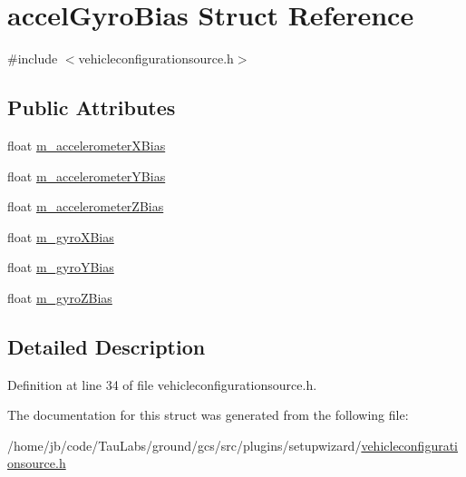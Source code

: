 \hypertarget{structaccel_gyro_bias}{\section{accel\-Gyro\-Bias \-Struct \-Reference}
\label{structaccel_gyro_bias}
}


{\ttfamily \#include $<$vehicleconfigurationsource.\-h$>$}

\subsection*{\-Public \-Attributes}
\begin{DoxyCompactItemize}
\item 
float \hyperlink{group___vehicle_configuration_source_ga982c33b20f567fe289dd461ce9bb0df2}{m\-\_\-accelerometer\-X\-Bias}
\item 
float \hyperlink{group___vehicle_configuration_source_ga76b3af5f8c4f87a92045a698eb32c681}{m\-\_\-accelerometer\-Y\-Bias}
\item 
float \hyperlink{group___vehicle_configuration_source_gaa0475cba1c09df9c39a69bbb62711b8e}{m\-\_\-accelerometer\-Z\-Bias}
\item 
float \hyperlink{group___vehicle_configuration_source_ga483a0631083ce446a08b73ecc712ed73}{m\-\_\-gyro\-X\-Bias}
\item 
float \hyperlink{group___vehicle_configuration_source_gade8f76b5b608f6446cb182c372598e53}{m\-\_\-gyro\-Y\-Bias}
\item 
float \hyperlink{group___vehicle_configuration_source_ga637101f3cecb351e7fe8d6106dd50d15}{m\-\_\-gyro\-Z\-Bias}
\end{DoxyCompactItemize}


\subsection{\-Detailed \-Description}


\-Definition at line 34 of file vehicleconfigurationsource.\-h.



\-The documentation for this struct was generated from the following file\-:\begin{DoxyCompactItemize}
\item 
/home/jb/code/\-Tau\-Labs/ground/gcs/src/plugins/setupwizard/\hyperlink{vehicleconfigurationsource_8h}{vehicleconfigurationsource.\-h}\end{DoxyCompactItemize}
